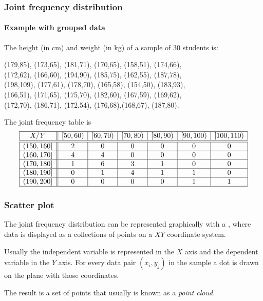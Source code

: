 \begin{frame}
\frametitle{Joint frequency distribution}
\framesubtitle{Example with grouped data}
The height (in cm) and weight (in kg) of a sample of 30 students is:
\begin{center}
(179,85), (173,65), (181,71), (170,65), (158,51), (174,66),\\
(172,62), (166,60), (194,90), (185,75), (162,55), (187,78),\\
(198,109), (177,61), (178,70), (165,58), (154,50), (183,93),\\
(166,51), (171,65), (175,70), (182,60), (167,59), (169,62),\\
(172,70), (186,71), (172,54), (176,68),(168,67), (187,80).
\end{center}

The joint frequency table is 
\[
\begin{array}{|c||c|c|c|c|c|c|}
\hline
  X/Y & [50,60) & [60,70) & [70,80) & [80,90) & [90,100) & [100,110) \\
  \hline\hline
  (150,160] & 2 & 0 & 0 & 0 & 0 & 0 \\
  \hline
  (160,170] & 4 & 4 & 0 & 0 & 0 & 0 \\
  \hline
  (170,180] & 1 & 6 & 3 & 1 & 0 & 0 \\
  \hline
  (180,190] & 0 & 1 & 4 & 1 & 1 & 0 \\
  \hline
  (190,200] & 0 & 0 & 0 & 0 & 1 & 1 \\
  \hline
\end{array}
\]
\end{frame}


\begin{frame}
\frametitle{Scatter plot}
The joint frequency distribution can be represented graphically with a , where data is displayed
as a collections of points on a $XY$ coordinate system.

Usually the independent variable is represented in the $X$ axis and the dependent variable in the $Y$ axis.
For every data pair $(x_i,y_j)$ in the sample a dot is drawn on the plane with those coordinates.  
\begin{center}
\resizebox{0.4\textwidth}{!}{}
\end{center}

The result is a set of points that usually is known as a \emph{point cloud}.


\end{frame}


